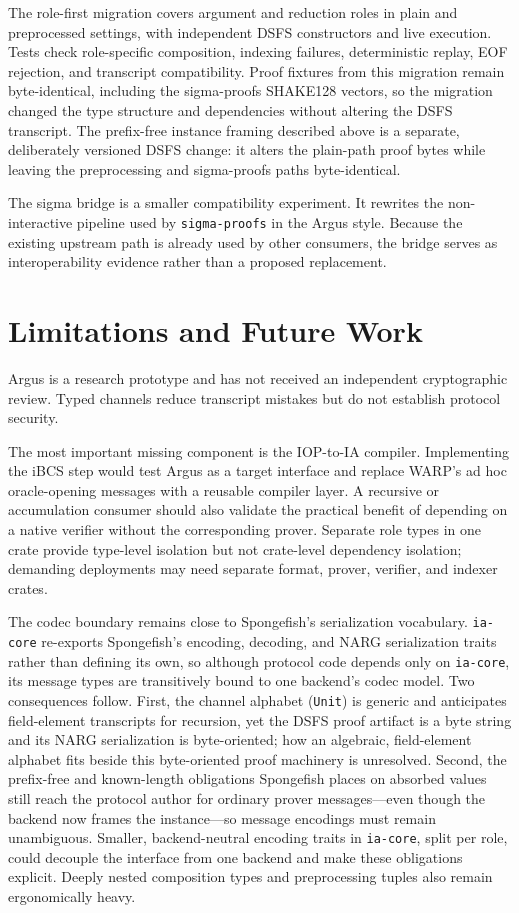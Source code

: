 \documentclass[11pt]{article}
\begin{document}
The role-first migration covers argument and reduction roles in plain and
preprocessed settings, with independent DSFS constructors and live execution.
Tests check role-specific composition, indexing failures, deterministic replay,
EOF rejection, and transcript compatibility. Proof fixtures from this migration
remain byte-identical, including the sigma-proofs SHAKE128 vectors, so the
migration changed the type structure and dependencies without altering the DSFS
transcript. The prefix-free instance framing described above is a separate,
deliberately versioned DSFS change: it alters the plain-path proof bytes while
leaving the preprocessing and sigma-proofs paths byte-identical.

The sigma bridge is a smaller compatibility experiment. It rewrites the
non-interactive pipeline used by \texttt{sigma-proofs} in the Argus style.
Because the existing upstream path is already used by other consumers, the
bridge serves as interoperability evidence rather than a proposed replacement.

\section{Limitations and Future Work}

Argus is a research prototype and has not received an independent
cryptographic review. Typed channels reduce transcript mistakes but do not
establish protocol security.

The most important missing component is the IOP-to-IA compiler. Implementing
the iBCS step would test Argus as a target interface and replace WARP's ad hoc
oracle-opening messages with a reusable compiler layer. A recursive or
accumulation consumer should also validate the practical benefit of depending
on a native verifier without the corresponding prover. Separate role types in
one crate provide type-level isolation but not crate-level dependency
isolation; demanding deployments may need separate format, prover, verifier,
and indexer crates.

The codec boundary remains close to Spongefish's serialization vocabulary.
\texttt{ia-core} re-exports Spongefish's encoding, decoding, and NARG
serialization traits rather than defining its own, so although protocol code
depends only on \texttt{ia-core}, its message types are transitively bound to
one backend's codec model. Two consequences follow. First, the channel alphabet
(\texttt{Unit}) is generic and anticipates field-element transcripts for
recursion, yet the DSFS proof artifact is a byte string and its NARG
serialization is byte-oriented; how an algebraic, field-element alphabet fits
beside this byte-oriented proof machinery is unresolved. Second, the prefix-free
and known-length obligations Spongefish places on absorbed values still reach
the protocol author for ordinary prover messages---even though the backend now
frames the instance---so message encodings must remain unambiguous. Smaller,
backend-neutral encoding traits in \texttt{ia-core}, split per role, could
decouple the interface from one backend and make these obligations explicit.
Deeply nested composition types and preprocessing tuples also remain
ergonomically heavy.
\end{document}
